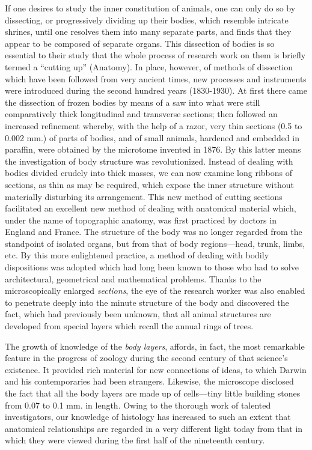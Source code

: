 If one desires to study the inner constitution of animals, one can only do so by dissecting, or
progressively dividing up their bodies, which resemble intricate shrines, until one resolves
them into many separate parts, and finds that they appear to be composed of separate organs.
This dissection of bodies is so essential to their study that the whole process of research work
on them is briefly termed a ``cutting up'' (Anatomy). In place, however, of methods of
dissection which have been followed from very ancient times, new processes and instruments
were introduced during the second hundred years (1830-1930). At first there came the
dissection of frozen bodies by means of a saw into what were still comparatively thick
longitudinal and transverse sections; then followed an increased refinement whereby, with
the help of a razor, very thin sections (0.5 to 0.002 mm.) of parts of bodies, and of small
animals, hardened and embedded in paraffin, were obtained by the microtome invented in
1876. By this latter means the investigation of body structure was revolutionized. Instead of
dealing with bodies divided crudely into thick masses, we can now examine long ribbons of
sections, as thin as may be required, which expose the inner structure without materially
disturbing its arrangement. This new method of cutting sections facilitated an excellent new
method of dealing with anatomical material which, under the name of topographic anatomy,
was first practiced by doctors in England and France. The structure of the body was no
longer regarded from the standpoint of isolated organs, but from that of body regions—head,
trunk, limbs, etc. By this more enlightened practice, a method of dealing with bodily
dispositions was adopted which had long been known to those who had to solve architectural,
geometrical and mathematical problems. Thanks to the microscopically enlarged \textit{sections}, the
eye of the research worker was also enabled to penetrate deeply into the minute structure of
the body and discovered the fact, which had previously been unknown, that all animal
structures are developed from special layers which recall the annual rings of trees.

The growth of knowledge of the \textit{body layers}, affords, in fact, the most remarkable feature in
the progress of zoology during the second century of that science's existence. It provided rich
material for new connections of ideas, to which Darwin and his contemporaries had been
strangers. Likewise, the microscope disclosed the fact that all the body layers are made up of
cells—tiny little building stones from 0.07 to 0.1 mm. in length. Owing to the thorough work
of talented investigators, our knowledge of histology has increased to such an extent that
anatomical relationships are regarded in a very different light today from that in which they
were viewed during the first half of the nineteenth century.

